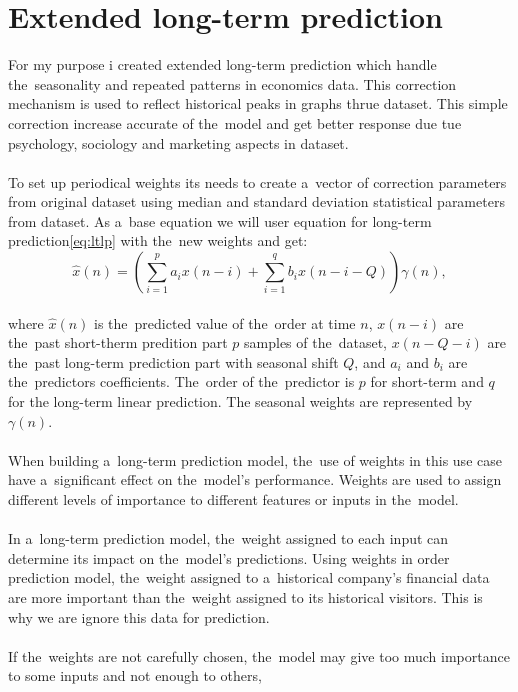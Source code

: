     \section{Extended long-term prediction}\label{sec:extlonglp}
    For my purpose i created extended long-term prediction which handle the~seasonality and repeated patterns
    in economics data. This correction mechanism is used to reflect historical peaks in graphs thrue dataset.
    This simple correction increase accurate of the~model and get better response due tue psychology,
    sociology and marketing aspects in dataset.\\
    \\
    To set up periodical weights its needs to create a~vector of correction parameters from original dataset using
    median and standard deviation statistical parameters from dataset. As a~base equation we will user equation
    for long-term prediction\ref{eq:ltlp} with the~new weights and get:
    \begin{equation} \label{eq:eltlp}
        \hat{x}(n) = \left(\sum_{i=1}^{p} a_i x(n-i) + \sum_{i=1}^{q} b_i x(n-i-Q)\right) \gamma(n),
    \end{equation}
    \\
    where $\hat{x}(n)$ is the~predicted value of the~order at time $n$, $x(n-i)$ are the~past short-therm
    predition part $p$ samples of the~dataset, $x(n-Q-i)$ are the~past long-term prediction part with seasonal
    shift $Q$, and $a_i$ and $b_i$ are the~predictors coefficients. The~order of the~predictor is $p$ for short-term
    and $q$ for the long-term linear prediction. The seasonal weights are represented by $\gamma(n)$.\\
    \\
    When building a~long-term prediction model, the~use of weights in this use case have a~significant effect on
    the~model's performance. Weights are used to assign different levels of importance to different
    features or inputs in the~model.\\
    \\
    In a~long-term prediction model, the~weight assigned to each input can determine its impact on the~model's predictions.
    Using weights in order prediction model, the~weight assigned to a~historical company's financial data are more important
    than the~weight assigned to its historical visitors. This is why we are ignore this data for prediction.\\
    \\
    If the~weights are not carefully chosen, the~model may give too much importance to some inputs and not enough to others,
